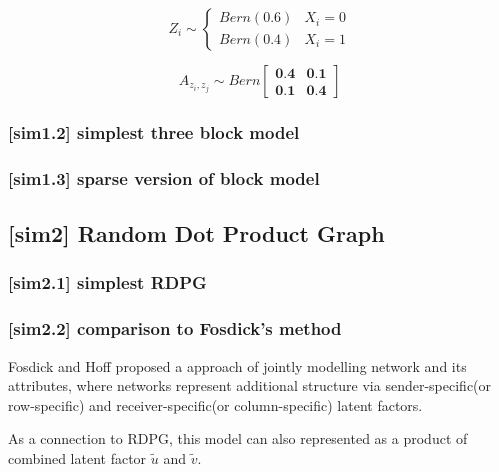 \documentclass[12pt]{article}
\theoremstyle{definition}
\begin{document}
\begin{equation}
Z_{i}  \sim  \left\{  \begin{array}{cc} Bern(0.6) & X_{i} = 0 \\ Bern(0.4) & X_{i} = 1  \end{array} \right.
\end{equation}

\begin{equation}
A_{z_{i}, z_{j}} \sim Bern \left[  \begin{array}{cc}   \textbf{0.4} & \textbf{0.1}  \\ \textbf{0.1} & \textbf{0.4} \end{array}  \right]
\end{equation}


\subsubsection{[sim1.2] simplest three block model}



\subsubsection{[sim1.3] sparse version of block model}




\subsection{[sim2] Random Dot Product Graph}

\subsubsection{[sim2.1] simplest RDPG}




\subsubsection{[sim2.2] comparison to Fosdick's method}


Fosdick and Hoff proposed a approach of jointly modelling network and its attributes, where networks represent additional structure via sender-specific(or row-specific) and receiver-specific(or column-specific) latent factors.

As a connection to RDPG, this model can also represented as a product of combined latent factor $\tilde{u}$ and $\tilde{v}$. 
\end{document}
